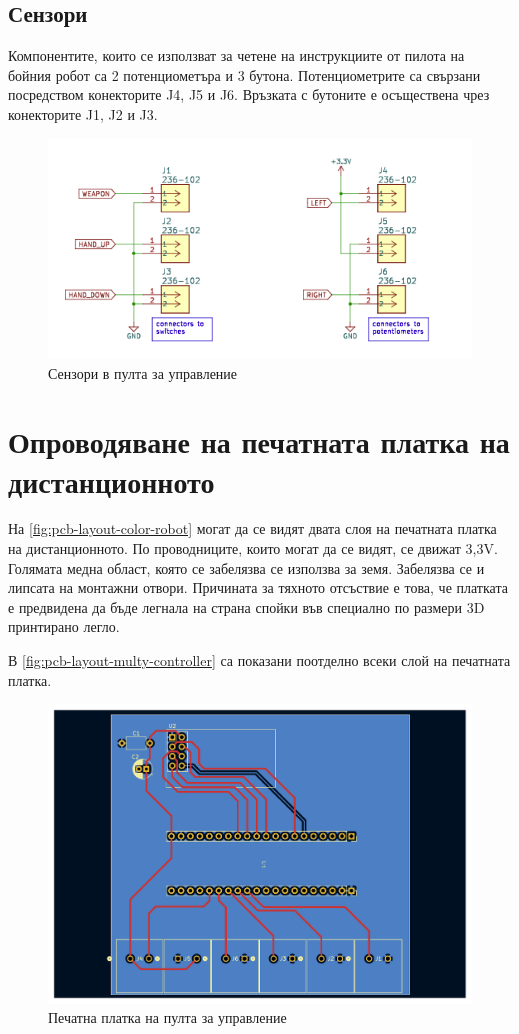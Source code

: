 \subsection{Сензори}

Компонентите, които се използват за четене на инструкциите от пилота на бойния робот са 2 потенциометъра и 3 бутона. Потенциометрите са свързани посредством конекторите J4, J5 и J6. Връзката с бутоните е осъществена чрез конекторите J1, J2 и J3.

\begin{figure}[H]
    \centering
    \includegraphics[width=0.6\linewidth]{images/sensors-controller.png}
    
    \caption{Сензори в пулта за управление}
    \label{fig:sensors-controller} 
\end{figure}


\section{Опроводяване на печатната платка на дистанционното}

На \cref{fig:pcb-layout-color-robot} могат да се видят двата слоя на печатната платка на дистанционното. По проводниците, които могат да се видят, се движат 3,3V. Голямата медна област, която се забелязва се използва за земя. Забелязва се и липсата на монтажни отвори. Причината за тяхното отсъствие е това, че платката е предвидена да бъде легнала на страна спойки във специално по размери 3D принтирано легло.

В \cref{fig:pcb-layout-multy-controller} са показани поотделно всеки слой на печатната платка.

\begin{figure}[H]
    \centering
    \includegraphics[width=\linewidth]{documents/PCB-layout-color-controller.pdf}
    
    \caption{Печатна платка на пулта за управление}
    \label{fig:pcb-layout-color-controller} 
\end{figure}